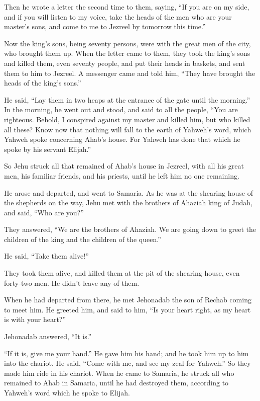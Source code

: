  Then he wrote a letter the second time to them, saying,
``If you are on my side, and if you will listen to my voice, take the
heads of the men who are your master's sons, and come to me to Jezreel
by tomorrow this time.''

Now the king's sons, being seventy persons, were with the great men of
the city, who brought them up.  When the letter came to
them, they took the king's sons and killed them, even seventy people,
and put their heads in baskets, and sent them to him to Jezreel.
 A messenger came and told him, ``They have brought the
heads of the king's sons.''

He said, ``Lay them in two heaps at the entrance of the gate until the
morning.''  In the morning, he went out and stood, and
said to all the people, ``You are righteous. Behold, I conspired against
my master and killed him, but who killed all these?  Know
now that nothing will fall to the earth of Yahweh's word, which Yahweh
spoke concerning Ahab's house. For Yahweh has done that which he spoke
by his servant Elijah.''

 So Jehu struck all that remained of Ahab's house in
Jezreel, with all his great men, his familiar friends, and his priests,
until he left him no one remaining.

 He arose and departed, and went to Samaria. As he was at
the shearing house of the shepherds on the way,  Jehu met
with the brothers of Ahaziah king of Judah, and said, ``Who are you?''

They answered, ``We are the brothers of Ahaziah. We are going down to
greet the children of the king and the children of the queen.''

 He said, ``Take them alive!''

They took them alive, and killed them at the pit of the shearing house,
even forty-two men. He didn't leave any of them.

 When he had departed from there, he met Jehonadab the
son of Rechab coming to meet him. He greeted him, and said to him, ``Is
your heart right, as my heart is with your heart?''

Jehonadab answered, ``It is.''

``If it is, give me your hand.'' He gave him his hand; and he took him
up to him into the chariot.  He said, ``Come with me, and
see my zeal for Yahweh.'' So they made him ride in his chariot.
 When he came to Samaria, he struck all who remained to
Ahab in Samaria, until he had destroyed them, according to Yahweh's word
which he spoke to Elijah.

